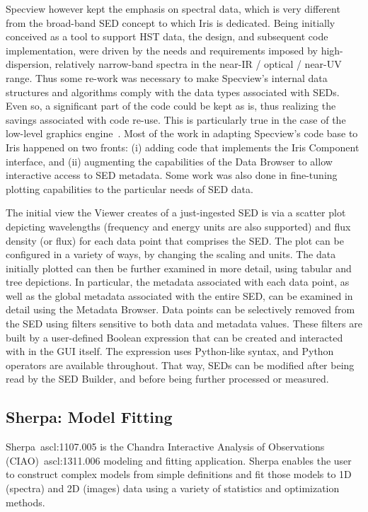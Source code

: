 \documentclass[preprint,authoryear,5p]{elsarticle}
\begin{document}
Specview however kept the emphasis on spectral data, which is very different from
the broad-band SED concept to which Iris is dedicated. Being initially conceived
as a tool to support HST data, the design, and subsequent code implementation,
were driven by the needs and requirements imposed by high-dispersion, relatively
narrow-band spectra in the near-IR / optical / near-UV range. Thus some re-work
was necessary to make Specview's internal data structures and algorithms comply with
the data types associated with SEDs. Even so, a significant part of the code
could be kept as is, thus realizing the savings associated with code re-use.
This is particularly true in the case of the low-level graphics
engine~\citep{2000ASPC..216...79B}. Most of the work in adapting Specview's code
base to Iris happened on two fronts: (i) adding code that implements the Iris
Component interface, and (ii) augmenting the capabilities of the Data Browser to
allow interactive access to SED metadata. Some work was also done in fine-tuning
plotting capabilities to the particular needs of SED data.

The initial view the Viewer creates of a just-ingested SED is via a scatter plot
depicting wavelengths (frequency and energy units are also supported) and flux
density (or flux) for each data point that comprises the SED. The plot can be
configured in a variety of ways, by changing the scaling and units. The data
initially plotted can then be further examined in more detail, using tabular and
tree depictions. In particular, the metadata associated with each data point, as
well as the global metadata associated with the entire SED, can be examined in
detail using the Metadata Browser. Data points can be selectively removed from
the SED using filters sensitive to both data and metadata values. These filters
are built by a user-defined Boolean expression that can be created and
interacted with in the GUI itself. The expression uses Python-like syntax, and
Python operators are available throughout. That way, SEDs can be modified after
being read by the SED Builder, and before being further processed or measured.

\subsection{Sherpa: Model Fitting} \label{subsec:sherpa} Sherpa~ascl:1107.005 is the
Chandra Interactive Analysis of Observations (CIAO)~ascl:1311.006 \citep{2006SPIE.6270E..60F}
modeling and fitting application. Sherpa enables the user to construct complex
models from simple definitions and fit those models to 1D (spectra) and 2D
(images) data using a variety of statistics and optimization methods.
\end{document}
